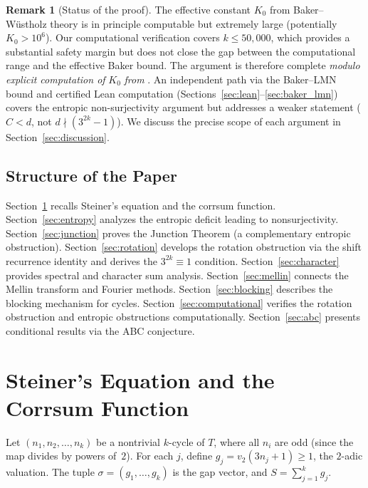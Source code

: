 \documentclass[12pt,a4paper]{amsart}
\theoremstyle{plain}
\theoremstyle{definition}
\newtheorem{remark}[theorem]{Remark}
\begin{document}
\begin{remark}[Status of the proof]\label{rem:gap}
The effective constant $K_0$ from Baker--W\"ustholz theory is in principle computable but extremely large (potentially $K_0 > 10^6$). Our computational verification covers $k \leq 50{,}000$, which provides a substantial safety margin but does not close the gap between the computational range and the effective Baker bound. The argument is therefore complete \emph{modulo explicit computation of} $K_0$ \emph{from} \cite{BakerWustholz1993,Yu2007}. An independent path via the Baker--LMN bound and certified Lean computation (Sections~\ref{sec:lean}--\ref{sec:baker_lmn}) covers the entropic non-surjectivity argument but addresses a weaker statement ($C < d$, not $d \nmid (3^{2k}-1)$). We discuss the precise scope of each argument in Section~\ref{sec:discussion}.
\end{remark}

\subsection{Structure of the Paper}

Section~\ref{sec:steiner} recalls Steiner's equation and the corrsum function. Section~\ref{sec:entropy} analyzes the entropic deficit leading to nonsurjectivity. Section~\ref{sec:junction} proves the Junction Theorem (a complementary entropic obstruction). Section~\ref{sec:rotation} develops the rotation obstruction via the shift recurrence identity and derives the $3^{2k} \equiv 1$ condition. Section~\ref{sec:character} provides spectral and character sum analysis. Section~\ref{sec:mellin} connects the Mellin transform and Fourier methods. Section~\ref{sec:blocking} describes the blocking mechanism for cycles. Section~\ref{sec:computational} verifies the rotation obstruction and entropic obstructions computationally. Section~\ref{sec:abc} presents conditional results via the ABC conjecture.

\section{Steiner's Equation and the Corrsum Function}
\label{sec:steiner}

Let $(n_1, n_2, \ldots, n_k)$ be a nontrivial $k$-cycle of $T$, where all $n_i$ are odd (since the map divides by powers of~$2$). For each $j$, define $g_j = v_2(3n_j + 1) \geq 1$, the $2$-adic valuation. The tuple $\sigma = (g_1, \ldots, g_k)$ is the gap vector, and $S = \sum_{j=1}^k g_j$.
\end{document}
